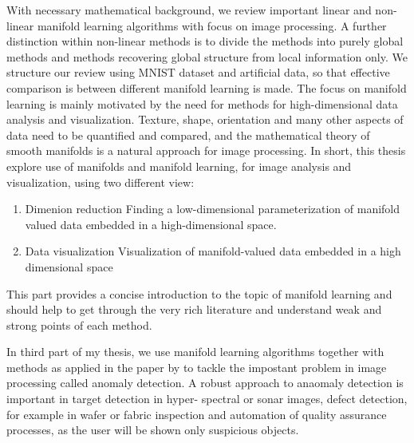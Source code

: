 \documentclass[12pt,a4paper]{article}
\numberwithin{equation}{section}
\numberwithin{figure}{section}
\numberwithin{table}{section}
\begin{document}
With necessary mathematical background, we review important linear and non-linear manifold learning algorithms with focus on image processing. A further distinction within non-linear methods is to divide the methods into purely global methods and methods recovering global structure from local information
only. We structure our review using MNIST dataset and artificial  data, so that effective comparison is between different manifold learning is made. The focus on manifold learning is mainly motivated by the need for methods for
high-dimensional data analysis and visualization. Texture, shape, orientation and many other aspects of data need to be quantified and compared, and the mathematical theory of smooth manifolds is a natural approach for image processing. In short, this thesis explore use of manifolds and manifold learning, for image analysis and visualization, using two different view: 
\begin{enumerate}
\item Dimenion reduction Finding a low-dimensional parameterization of manifold valued data embedded in a high-dimensional space.
\item Data visualization Visualization of manifold-valued data embedded in a high dimensional space
\end{enumerate}
This part provides a concise introduction to the topic of manifold learning and should help to get through the very rich literature and understand weak and strong points of each method.

In third part of my thesis, we use manifold learning algorithms together with methods as applied in the paper by \citep{Mishne2017} to tackle the impostant problem in image processing called anomaly detection. A robust approach to anaomaly detection is  important in target detection in hyper-
spectral or sonar images,  defect detection, for example in wafer or fabric
inspection and automation of quality assurance processes, as the user will be shown only suspicious objects.


 

\end{document}
